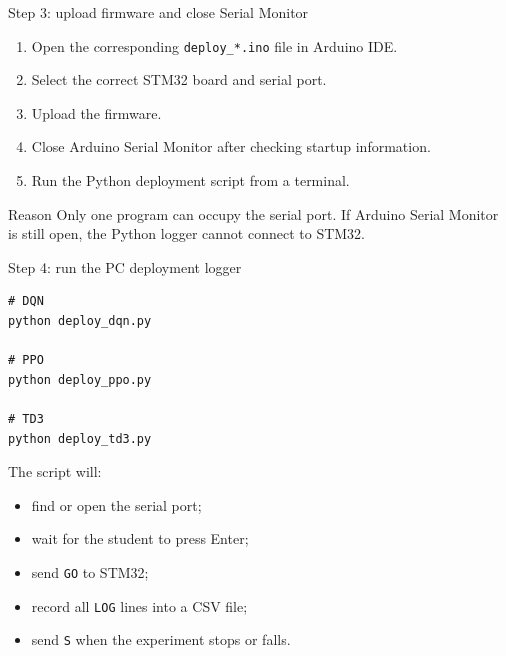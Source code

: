 \documentclass[aspectratio=169]{beamer}
\begin{document}
\begin{frame}{Step 3: upload firmware and close Serial Monitor}
\begin{enumerate}
    \item Open the corresponding \texttt{deploy\_*.ino} file in Arduino IDE.
    \vspace{0.25cm}
    \item Select the correct STM32 board and serial port.
    \vspace{0.25cm}
    \item Upload the firmware.
    \vspace{0.25cm}
    \item Close Arduino Serial Monitor after checking startup information.
    \vspace{0.25cm}
    \item Run the Python deployment script from a terminal.
\end{enumerate}

\vspace{0.15cm}
\begin{block}{Reason}
\small
Only one program can occupy the serial port. If Arduino Serial Monitor is still open, the Python logger cannot connect to STM32.
\end{block}
\end{frame}

\begin{frame}[fragile]{Step 4: run the PC deployment logger}
\begin{lstlisting}[basicstyle=\ttfamily\scriptsize]
# DQN
python deploy_dqn.py

# PPO
python deploy_ppo.py

# TD3
python deploy_td3.py
\end{lstlisting}

\vspace{0.2cm}

The script will:
\begin{itemize}
    \item find or open the serial port;
    \item wait for the student to press Enter;
    \item send \texttt{GO} to STM32;
    \item record all \texttt{LOG} lines into a CSV file;
    \item send \texttt{S} when the experiment stops or falls.
\end{itemize}
\end{frame}
\end{document}
